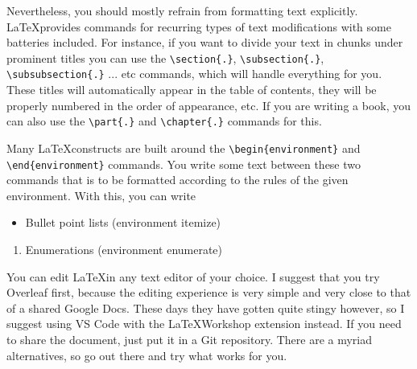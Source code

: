 \documentclass[9pt,a4paper,twoside]{tau-class/tau}
\begin{document}
    Nevertheless, you should mostly refrain from formatting text explicitly. \LaTeX provides commands for recurring types of  text modifications with some batteries included. For instance, if you want to divide your text in chunks under prominent titles you can use the \verb|\section{.}|, \verb|\subsection{.}|, \verb|\subsubsection{.}| ... etc commands, which will handle everything for you. These titles will automatically appear in the table of contents, they will be properly numbered in the order of appearance, etc. If you are writing a book, you can also use the \verb|\part{.}| and \verb|\chapter{.}| commands for this.

    Many \LaTeX constructs are built around the \verb|\begin{environment}| and \verb|\end{environment}| commands. You write some text between these two commands that is to be formatted according to the rules of the given environment. With this, you can write

    \begin{itemize}
        \item Bullet point lists (environment itemize)
    \end{itemize}

    \begin{enumerate}
        \item Enumerations (environment enumerate)
    \end{enumerate}

    You can edit \LaTeX in any text editor of your choice. I suggest that you try Overleaf first, because the editing experience is very simple and very close to that of a shared Google Docs. These days they have gotten quite stingy however, so I suggest using VS Code with the \LaTeX Workshop extension instead. If you need to share the document, just put it in a Git repository. There are a myriad alternatives, so go out there and try what works for you.
		
\end{document}
